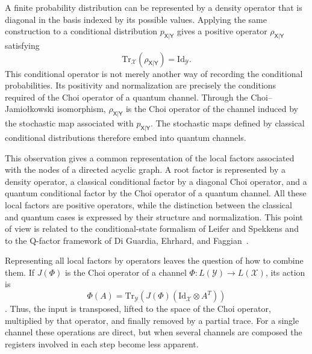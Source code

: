\documentclass[
    aps,
    pra,
    reprint,
    superscriptaddress,
    nofootinbib
]{revtex4-2}
\theoremstyle{definition}
\theoremstyle{plain}
\begin{document}
A finite probability distribution can be represented by a density operator
that is diagonal in the basis indexed by its possible values. Applying the
same construction to a conditional distribution
$p_{\mathsf{X}|\mathsf{Y}}$ gives a positive operator
$\rho_{\mathsf{X}|\mathsf{Y}}$ satisfying
\begin{equation}
    \mathrm{Tr}_{\mathcal{X}}
    \left(
        \rho_{\mathsf{X}|\mathsf{Y}}
    \right)
    =
    \mathrm{Id}_{\mathcal{Y}}.
\end{equation}
This conditional operator is not merely another way of recording the
conditional probabilities. Its positivity and normalization are precisely
the conditions required of the Choi operator of a quantum channel. Through
the Choi--Jamio{\l}kowski isomorphism,
$\rho_{\mathsf{X}|\mathsf{Y}}$ is the Choi operator of the channel induced
by the stochastic map associated with
$p_{\mathsf{X}|\mathsf{Y}}$. The stochastic maps defined by classical
conditional distributions therefore embed into quantum channels.

This observation gives a common representation of the local factors
associated with the nodes of a directed acyclic graph. A root factor is
represented by a density operator, a classical conditional factor by a
diagonal Choi operator, and a quantum conditional factor by the Choi
operator of a quantum channel. All these local factors are positive
operators, while the distinction between the classical and quantum cases
is expressed by their structure and normalization. This point of view is
related to the conditional-state formalism of Leifer and Spekkens
\cite{LeiferSpekkens2013} and to the Q-factor framework of Di Guardia,
Ehrhard, and Faggian~\cite{DiGuardiaEhrhardFaggian2026}.

Representing all local factors by operators leaves the question of how to
combine them. If $J(\Phi)$ is the Choi operator of a channel
$\Phi:L(\mathcal{Y})\to L(\mathcal{X})$, its action is
\begin{equation}
    \Phi(A)
    =
    \mathrm{Tr}_{\mathcal{Y}}
    \left(
        J(\Phi)
        \left(
            \mathrm{Id}_{\mathcal{X}}
            \otimes
            A^{T}
        \right)
    \right)
\end{equation}
\cite[Eq.~(2.66)]{Watrous2018}. Thus, the input is transposed, lifted to
the space of the Choi operator, multiplied by that operator, and finally
removed by a partial trace. For a single channel these operations are
direct, but when several channels are composed the registers involved in
each step become less apparent.
\end{document}
